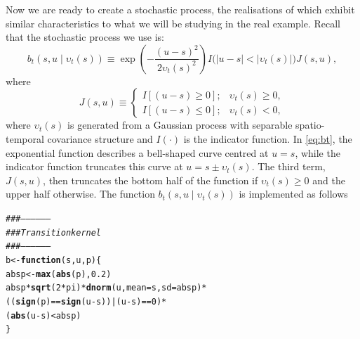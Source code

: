 \documentclass[a4paper,11pt]{article}\usepackage[]{graphicx}\usepackage[]{color}
\makeatletter
\newcommand{\hlnum}[1]{\textcolor[rgb]{0.686,0.059,0.569}{#1}}%
\newcommand{\hlcom}[1]{\textcolor[rgb]{0.678,0.584,0.686}{\textit{#1}}}%
\newcommand{\hlopt}[1]{\textcolor[rgb]{0,0,0}{#1}}%
\newcommand{\hlstd}[1]{\textcolor[rgb]{0.345,0.345,0.345}{#1}}%
\newcommand{\hlkwa}[1]{\textcolor[rgb]{0.161,0.373,0.58}{\textbf{#1}}}%
\newcommand{\hlkwb}[1]{\textcolor[rgb]{0.69,0.353,0.396}{#1}}%
\newcommand{\hlkwc}[1]{\textcolor[rgb]{0.333,0.667,0.333}{#1}}%
\newcommand{\hlkwd}[1]{\textcolor[rgb]{0.737,0.353,0.396}{\textbf{#1}}}%
\newenvironment{kframe}{%
 \def\at@end@of@kframe{}%
 \ifinner\ifhmode%
  \def\at@end@of@kframe{\end{minipage}}%
  \begin{minipage}{\columnwidth}%
 \fi\fi%
 \def\FrameCommand##1{\hskip\@totalleftmargin \hskip-\fboxsep
 \colorbox{shadecolor}{##1}\hskip-\fboxsep
     \hskip-\linewidth \hskip-\@totalleftmargin \hskip\columnwidth}%
 \MakeFramed {\advance\hsize-\width
   \@totalleftmargin\z@ \linewidth\hsize
   \@setminipage}}%
 {\par\unskip\endMakeFramed%
 \at@end@of@kframe}
\newenvironment{knitrout}{}{} %
\makeatother
\begin{document}
Now we are ready to create a stochastic process, the realisations of which exhibit similar characteristics to what we will be studying in the real example. Recall that the stochastic process we use is:
\begin{equation}\label{eq:bt}                                                                                   b_t(s,u\mid  \upsilon_t(s)) \equiv \exp\left(-\frac{(u-s)^2}{2\upsilon_t(s)^2}\right)I\big(|u-s| < |\upsilon_t(s)|\big)J(s,u),                                                                                 
\end{equation}
\noindent where
\begin{equation*}                                                                                               J(s,u) \equiv \left\{ \begin{array}{ll} I[(u-s) \ge 0]; & \upsilon_t(s) \ge 0, \\                                                                                                                              
                                        I[(u-s) \le 0]; & \upsilon_t(s) < 0,                                    \end{array}\right.                                                                                                                                                                                             
\end{equation*}
where $\upsilon_t(s)$ is generated from a Gaussian process with separable spatio-temporal covariance structure and $I(\cdot)$ is the indicator function. In \eqref{eq:bt}, the exponential function describes a bell-shaped curve centred at $u = s$, while the indicator function truncates this curve at $u = s \pm \upsilon_t(s)$. The third term, $J(s,u)$, then truncates the bottom half of the function if $\upsilon_t(s) \ge 0$ and the upper half otherwise. The function $b_t(s,u\mid  \upsilon_t(s))$ is implemented as follows

\begin{knitrout}
\color{fgcolor}\begin{kframe}
\begin{alltt}
\hlcom{###------------------}
\hlcom{### Transition kernel }
\hlcom{###------------------}
\hlstd{b} \hlkwb{<-} \hlkwa{function}\hlstd{(}\hlkwc{s}\hlstd{,}\hlkwc{u}\hlstd{,}\hlkwc{p}\hlstd{) \{}
  \hlstd{absp} \hlkwb{<-} \hlkwd{max}\hlstd{(}\hlkwd{abs}\hlstd{(p),}\hlnum{0.2}\hlstd{)}
  \hlstd{absp}\hlopt{*}\hlkwd{sqrt}\hlstd{(}\hlnum{2}\hlopt{*}\hlstd{pi)} \hlopt{*} \hlkwd{dnorm}\hlstd{(u,}\hlkwc{mean} \hlstd{= s,} \hlkwc{sd} \hlstd{=absp)} \hlopt{*}
    \hlstd{((}\hlkwd{sign}\hlstd{(p)} \hlopt{==} \hlkwd{sign}\hlstd{(u}\hlopt{-}\hlstd{s))} \hlopt{|} \hlstd{(u}\hlopt{-}\hlstd{s)} \hlopt{==} \hlnum{0}\hlstd{)} \hlopt{*}
    \hlstd{(}\hlkwd{abs}\hlstd{(u} \hlopt{-} \hlstd{s)} \hlopt{<} \hlstd{absp)}
\hlstd{\}}
\end{alltt}
\end{kframe}
\end{knitrout}
\end{document}
